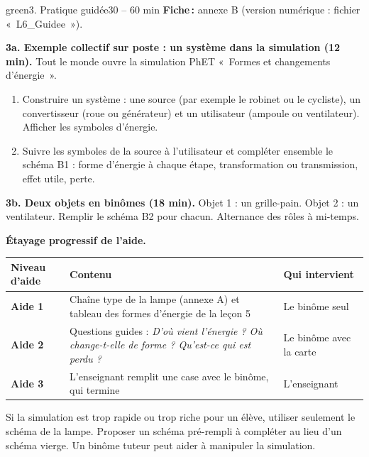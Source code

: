 \documentclass[11pt,a4paper]{article}
\begin{document}
\begin{etape}{green}{3. Pratique guidée}{30 -- 60 min}
\textbf{Fiche\,:} annexe B (version numérique : fichier «~L6\_Guidee~»).

\medskip
\textbf{3a. Exemple collectif sur poste : un système dans la simulation (12 min).} Tout le monde ouvre la simulation PhET «~Formes et changements d'énergie~».
\begin{enumerate}
 \item Construire un système : une source (par exemple le robinet ou le cycliste), un convertisseur (roue ou générateur) et un utilisateur (ampoule ou ventilateur). Afficher les symboles d'énergie.
 \item Suivre les symboles de la source à l'utilisateur et compléter ensemble le schéma B1 : forme d'énergie à chaque étape, transformation ou transmission, effet utile, perte.
\end{enumerate}

\textbf{3b. Deux objets en binômes (18 min).} Objet 1 : un grille-pain. Objet 2 : un ventilateur. Remplir le schéma B2 pour chacun. Alternance des rôles à mi-temps.

\textbf{Étayage progressif de l'aide.}
\begin{center}
\begin{tabularx}{\linewidth}{>{\bfseries}p{2.4cm}Y p{4.6cm}}
\toprule
Niveau d'aide & Contenu & Qui intervient\\
\midrule
Aide 1 & Chaîne type de la lampe (annexe A) et tableau des formes d'énergie de la leçon 5 & Le binôme seul\\
Aide 2 & Questions guides : \emph{D'où vient l'énergie ? Où change-t-elle de forme ? Qu'est-ce qui est perdu ?} & Le binôme avec la carte\\
Aide 3 & L'enseignant remplit une case avec le binôme, qui termine & L'enseignant\\
\bottomrule
\end{tabularx}
\end{center}

\begin{astuce}
Si la simulation est trop rapide ou trop riche pour un élève, utiliser seulement le schéma de la lampe. Proposer un schéma pré-rempli à compléter au lieu d'un schéma vierge. Un binôme tuteur peut aider à manipuler la simulation.
\end{astuce}
\end{etape}
\end{document}
